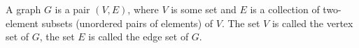 

\setcounter{section}{1}
\setcounter{subsection}{1}
\setcounter{dfn}{1}

\begin{dfn}
\label{dfn:Graph}
A graph $G$ is a pair $(V,E)$, where $V$ is some set and $E$ is a collection of two-element subsets (unordered pairs of elements) of $V$.
The set $V$ is called the vertex set of $G$, the set $E$ is called the edge set of $G$.
\end{dfn}

